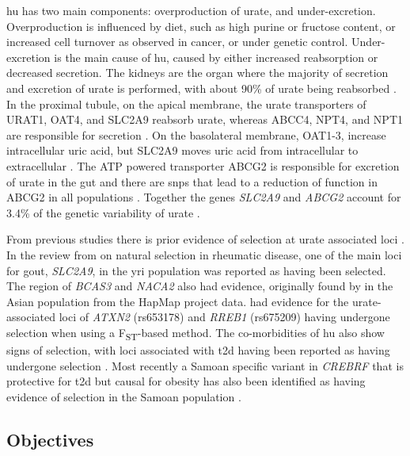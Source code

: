 \documentclass[]{report}
\begin{document}
\Gls{hu} has two main components: overproduction of urate, and
under-excretion. Overproduction is influenced by diet, such as high
purine or fructose content, or increased cell turnover as observed in
cancer, or under genetic control. Under-excretion is the main cause of
\gls{hu}, caused by either increased reabsorption or decreased
secretion. The kidneys are the organ where the majority of secretion and
excretion of urate is performed, with about 90\% of urate being
reabsorbed \citep{Kutzing2008}. In the proximal tubule, on the apical
membrane, the urate transporters of URAT1, OAT4, and SLC2A9 reabsorb
urate, whereas ABCC4, NPT4, and NPT1 are responsible for secretion
\citep{Mandal2015}. On the basolateral membrane, OAT1-3, increase
intracellular uric acid, but SLC2A9 moves uric acid from intracellular
to extracellular \citep{Mandal2015}. The ATP powered transporter ABCG2
is responsible for excretion of urate in the gut and there are
\glspl{snp} that lead to a reduction of function in ABCG2 in all
populations \citep{Phipps-Green2010, Cleophas2017}. Together the genes
\emph{SLC2A9} and \emph{ABCG2} account for 3.4\% of the genetic
variability of urate \citep{Kottgen2013}.

From previous studies there is prior evidence of selection at urate
associated loci \citep{Zhang2013a, Grossman2013, Ramos2017}. In the
review from \citet{Ramos2017} on natural selection in rheumatic disease,
one of the main loci for gout, \emph{SLC2A9}, in the \gls{yri}
population was reported as having been selected. The region of
\emph{BCAS3} and \emph{NACA2} also had evidence, originally found by
\citet{Grossman2013} in the Asian population from the HapMap project
data. \citet{Zhang2013a} had evidence for the urate-associated loci of
\emph{ATXN2} (rs653178) and \emph{RREB1} (rs675209) having undergone
selection when using a F\textsubscript{ST}-based method. The
co-morbidities of \gls{hu} also show signs of selection, with loci
associated with \gls{t2d} having been reported as having undergone
selection
\citep{pickrell2009signals, voight2006map, Grossman2010, Grossman2013}.
Most recently a Samoan specific variant in \emph{CREBRF} that is
protective for \gls{t2d} but causal for obesity has also been identified
as having evidence of selection in the Samoan population
\citep{Minster2016}.

\subsection{Objectives}\label{objectives}
\end{document}
